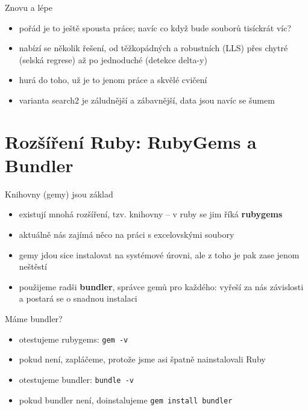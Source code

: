 \documentclass{beamer}
\begin{document}
\begin{frame}{Znovu a lépe}
  \begin{itemize}
    \item pořád je to ještě spousta práce; navíc co když bude souborů tisíckrát víc?
    \item nabízí se několik řešení, od těžkopádných a robustních (LLS) přes chytré (selská regrese) až po jednoduché (detekce delta-y)
    \item hurá do toho, už je to jenom práce a skvělé cvičení
    \item varianta search2 je záludnější a zábavnější, data jsou navíc se šumem
  \end{itemize}
\end{frame}

\section{Rozšíření Ruby: RubyGems a Bundler}

\begin{frame}{Knihovny (gemy) jsou základ}
  \begin{itemize}
    \item existují mnohá rozšíření, tzv. knihovny -- v ruby se jim říká \textbf{rubygems}
    \item aktuálně nás zajímá něco na práci s excelovskými soubory
    \item gemy jdou sice instalovat na systémové úrovni, ale z toho je pak zase jenom neštěstí
    \item použijeme radši \textbf{bundler}, správce gemů pro každého: vyřeší za nás závislosti a postará se o snadnou instalaci
  \end{itemize}
\end{frame}

\begin{frame}{Máme bundler?}
  \begin{itemize}
    \item otestujeme rubygems: \texttt{gem -v}
    \item pokud není, zapláčeme, protože jsme asi špatně nainstalovali Ruby
    \item otestujeme bundler: \texttt{bundle -v}
    \item pokud bundler není, doinstalujeme \texttt{gem install bundler}
  \end{itemize}
\end{frame}
\end{document}
